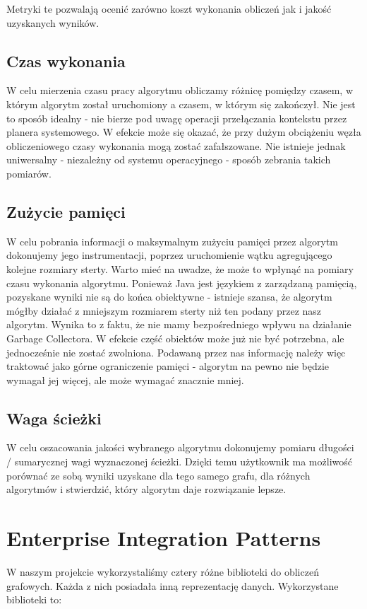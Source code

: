 Metryki te pozwalają ocenić zarówno koszt wykonania obliczeń jak i jakość uzyskanych wyników.

\subsection{Czas wykonania}

W celu mierzenia czasu pracy algorytmu obliczamy różnicę pomiędzy czasem, w którym algorytm został uruchomiony a czasem, w którym się zakończył.
Nie jest to sposób idealny - nie bierze pod uwagę operacji przełączania kontekstu przez planera systemowego.
W efekcie może się okazać, że przy dużym obciążeniu węzła obliczeniowego czasy wykonania mogą zostać zafałszowane.
Nie istnieje jednak uniwersalny - niezależny od systemu operacyjnego - sposób zebrania takich pomiarów.

\subsection{Zużycie pamięci}

W celu pobrania informacji o maksymalnym zużyciu pamięci przez algorytm dokonujemy jego instrumentacji, poprzez uruchomienie wątku agregującego kolejne rozmiary sterty.
Warto mieć na uwadze, że może to wpłynąć na pomiary czasu wykonania algorytmu.
Ponieważ Java jest językiem z zarządzaną pamięcią, pozyskane wyniki nie są do końca obiektywne - istnieje szansa, że algorytm mógłby działać z mniejszym rozmiarem sterty niż ten podany przez nasz algorytm.
Wynika to z faktu, że nie mamy bezpośredniego wpływu na działanie Garbage Collectora.
W efekcie część obiektów może już nie być potrzebna, ale jednocześnie nie zostać zwolniona.
Podawaną przez nas informację należy więc traktować jako górne ograniczenie pamięci - algorytm na pewno nie będzie wymagał jej więcej, ale może wymagać znacznie mniej.

\subsection{Waga ścieżki}

W celu oszacowania jakości wybranego algorytmu dokonujemy pomiaru długości / sumarycznej wagi wyznaczonej ścieżki.
Dzięki temu użytkownik ma możliwość porównać ze sobą wyniki uzyskane dla tego samego grafu, dla różnych algorytmów i stwierdzić, który algorytm daje rozwiązanie lepsze.

\section{Enterprise Integration Patterns}
W naszym projekcie wykorzystaliśmy cztery różne biblioteki do obliczeń grafowych. 
Każda z nich posiadała inną reprezentację danych. Wykorzystane biblioteki to:

